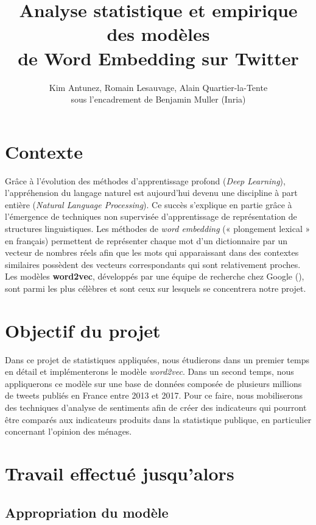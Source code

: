\documentclass[11pt,french,french]{article}
\title{Analyse statistique et empirique des modèles\\
de Word Embedding sur Twitter}
\author{Kim Antunez, Romain Lesauvage, Alain Quartier-la-Tente\\
sous l'encadrement de Benjamin Muller (Inria)}
\date{}
\begin{document}
\maketitle


\hypertarget{contexte}{%
\section{Contexte}\label{contexte}}

Grâce à l'évolution des méthodes d'apprentissage profond (\emph{Deep
Learning}), l'appréhension du langage naturel est aujourd'hui devenu une
discipline à part entière (\emph{Natural Language Processing}). Ce
succès s'explique en partie grâce à l'émergence de techniques non
supervisée d'apprentissage de représentation de structures
linguistiques. Les méthodes de \emph{word embedding} (« plongement
lexical » en français) permettent de représenter chaque mot d'un
dictionnaire par un vecteur de nombres réels afin que les mots qui
apparaissant dans des contextes similaires possèdent des vecteurs
correspondants qui sont relativement proches. Les modèles
\textbf{word2vec}, développés par une équipe de recherche chez Google
(\cite{Mikolov}), sont parmi les plus célèbres et sont ceux sur lesquels
se concentrera notre projet.

\hypertarget{objectif-du-projet}{%
\section{Objectif du projet}\label{objectif-du-projet}}

Dans ce projet de statistiques appliquées, nous étudierons dans un
premier temps en détail et implémenterons le modèle \emph{word2vec}.
Dans un second temps, nous appliquerons ce modèle sur une base de
données composée de plusieurs millions de tweets publiés en France entre
2013 et 2017. Pour ce faire, nous mobiliserons des techniques d'analyse
de sentiments afin de créer des indicateurs qui pourront être comparés
aux indicateurs produits dans la statistique publique, en particulier
concernant l'opinion des ménages.

\hypertarget{travail-effectuuxe9-jusqualors}{%
\section{Travail effectué
jusqu'alors}\label{travail-effectuuxe9-jusqualors}}

\hypertarget{appropriation-du-moduxe8le}{%
\subsection{Appropriation du modèle}\label{appropriation-du-moduxe8le}}
\end{document}
